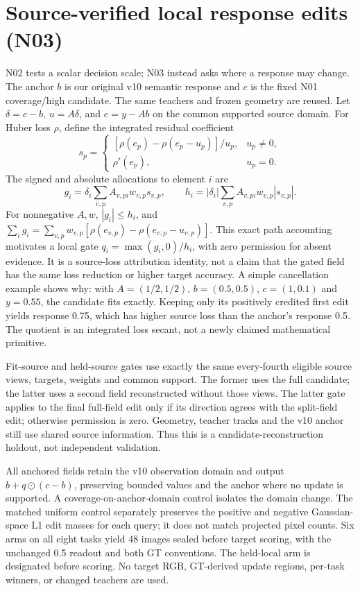 \section{Source-verified local response edits (N03)}
N02 tests a scalar decision scale; N03 instead asks where a response may change.
The anchor $b$ is our original v10 semantic response and $c$ is the fixed N01
coverage/high candidate. The same teachers and frozen geometry are reused.
Let $\delta=c-b$, $u=A\delta$, and $e=y-Ab$ on the common supported source domain.
For Huber loss $\rho$, define the integrated residual coefficient
\begin{equation}
 s_p=\begin{cases}
 [\rho(e_p)-\rho(e_p-u_p)]/u_p,&u_p\ne0,\\
 \rho'(e_p),&u_p=0.
 \end{cases}
\end{equation}
The signed and absolute allocations to element $i$ are
\begin{equation}
 g_i=\delta_i\sum_{v,p} A_{v,pi}w_{v,p}s_{v,p},\qquad
 h_i=|\delta_i|\sum_{v,p} A_{v,pi}w_{v,p}|s_{v,p}|.
\end{equation}
For nonnegative $A,w$, $|g_i|\le h_i$, and
$\sum_i g_i=\sum_{v,p}w_{v,p}[\rho(e_{v,p})-\rho(e_{v,p}-u_{v,p})]$.
This exact path accounting motivates a local gate
$q_i=\max(g_i,0)/h_i$, with zero permission for absent evidence. It is a
source-loss attribution identity, not a claim that the gated field has the same
loss reduction or higher target accuracy. A simple cancellation example shows why:
with $A=(1/2,1/2)$, $b=(0.5,0.5)$, $c=(1,0.1)$ and $y=0.55$, the candidate fits
exactly. Keeping only its positively credited first edit yields response 0.75,
which has higher source loss than the anchor's response 0.5. The quotient is an integrated loss
secant, not a newly claimed mathematical primitive.

Fit-source and held-source gates use exactly the same every-fourth eligible
source views, targets, weights and common support. The former uses the full
candidate; the latter uses a second field reconstructed without those views.
The latter gate applies to the final full-field edit only if its direction
agrees with the split-field edit; otherwise permission is zero. Geometry,
teacher tracks and the v10 anchor still use shared source information. Thus
this is a candidate-reconstruction holdout, not independent validation.

All anchored fields retain the v10 observation domain and output
$b+q\odot(c-b)$, preserving bounded values and the anchor where no update is
supported. A coverage-on-anchor-domain control isolates the domain change.
The matched uniform control separately preserves the positive and negative
Gaussian-space L1 edit masses for each query; it does not match projected
pixel counts. Six arms on all eight tasks yield 48 images sealed before target
scoring, with the unchanged 0.5 readout and both GT conventions. The held-local
arm is designated before scoring. No target RGB, GT-derived update regions,
per-task winners, or changed teachers are used.

